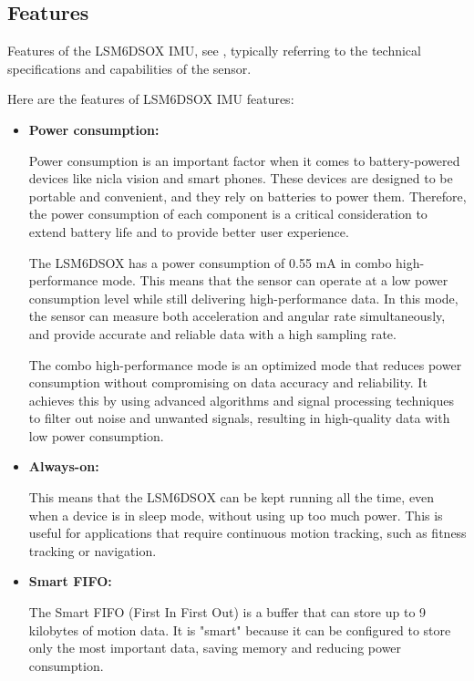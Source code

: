 \bigskip

\subsection{Features}

Features of the LSM6DSOX IMU, see \cite{STMicroelectronics:2018}, typically referring to the technical specifications and capabilities of the sensor.

\bigskip

Here are the features of LSM6DSOX IMU features:

\begin{itemize}
	\item  \textbf{Power consumption: }
	
	Power consumption is an important factor when it comes to battery-powered devices like nicla vision and smart phones. These devices are designed to be portable and convenient, and they rely on batteries to power them. Therefore, the power consumption of each component is a critical consideration to extend battery life and to provide better user experience.
	
	\bigskip
	
	The LSM6DSOX has a power consumption of 0.55 mA in combo high-performance mode. This means that the sensor can operate at a low power consumption level while still delivering high-performance data. In this mode, the sensor can measure both acceleration and angular rate simultaneously, and provide accurate and reliable data with a high sampling rate.
	
	\bigskip
	
	The combo high-performance mode is an optimized mode that reduces power consumption without compromising on data accuracy and reliability. It achieves this by using advanced algorithms and signal processing techniques to filter out noise and unwanted signals, resulting in high-quality data with low power consumption.
	
	
	\item  \textbf{Always-on:}
	
	This means that the LSM6DSOX can be kept running all the time, even when a device is in sleep mode, without using up too much power. This is useful for applications that require continuous motion tracking, such as fitness tracking or navigation.
	
	
	\item  \textbf{Smart FIFO: }
	
	The Smart FIFO (First In First Out)  is a buffer that can store up to 9 kilobytes of motion data. It is "smart" because it can be configured to store only the most important data, saving memory and reducing power consumption.\cite{Martinez:2022}
	

\end{itemize}
